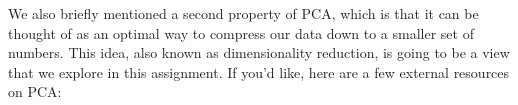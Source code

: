 We also briefly mentioned a second property of PCA, which is that it can be thought of as an optimal way to compress our data down to a smaller set of numbers.  This idea, also known as dimensionality reduction, is going to be a view that we explore in this assignment.
%
%
%
%
%
%
If you'd like, here are a few external resources on PCA:
